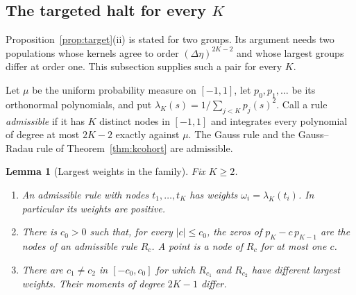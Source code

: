 \documentclass[12pt]{article}
\newtheorem{lemma}[theorem]{Lemma}
\theoremstyle{definition}
\theoremstyle{remark}
\begin{document}
\subsection{The targeted halt for every $K$}\label{app:everyK}

Proposition~\ref{prop:target}(ii) is stated for two groups. Its argument needs two populations whose kernels agree to order $(\Delta\eta)^{2K-2}$ and whose largest groups differ at order one. This subsection supplies such a pair for every $K$.

Let $\mu$ be the uniform probability measure on $[-1,1]$, let $p_0,p_1,\ldots$ be its orthonormal polynomials, and put $\lambda_K(s)=1/\sum_{j<K}p_j(s)^2$. Call a rule \emph{admissible} if it has $K$ distinct nodes in $[-1,1]$ and integrates every polynomial of degree at most $2K-2$ exactly against $\mu$. The Gauss rule and the Gauss--Radau rule of Theorem~\ref{thm:kcohort} are admissible.

\begin{lemma}[Largest weights in the family]\label{lem:everyK}
Fix $K\ge2$.
\begin{enumerate}[label=(\roman*),itemsep=1pt]
\item An admissible rule with nodes $t_1,\ldots,t_K$ has weights $\omega_i=\lambda_K(t_i)$. In particular its weights are positive.
\item There is $c_0>0$ such that, for every $|c|\le c_0$, the zeros of $p_K-c\,p_{K-1}$ are the nodes of an admissible rule $R_c$. A point is a node of $R_c$ for at most one $c$.
\item There are $c_1\ne c_2$ in $[-c_0,c_0]$ for which $R_{c_1}$ and $R_{c_2}$ have different largest weights. Their moments of degree $2K-1$ differ.
\end{enumerate}
\end{lemma}
\end{document}
